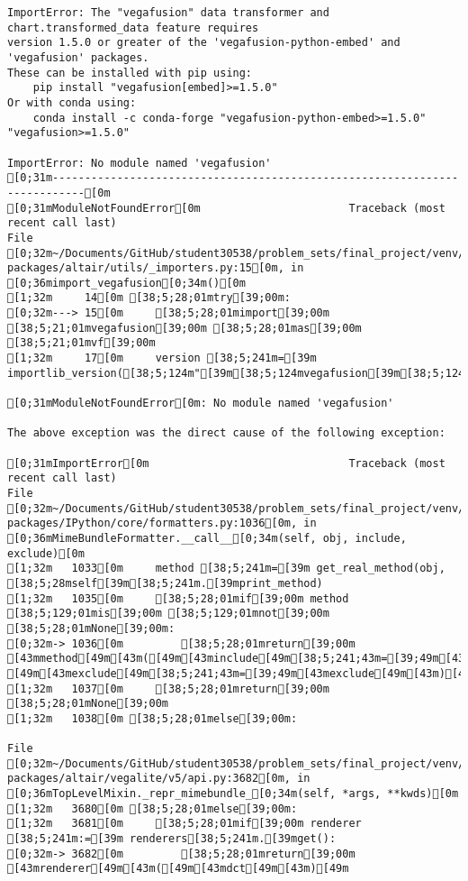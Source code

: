 \documentclass[
  letterpaper,
  DIV=11,
  numbers=noendperiod]{scrartcl}
\begin{document}
\begin{verbatim}
ImportError: The "vegafusion" data transformer and chart.transformed_data feature requires
version 1.5.0 or greater of the 'vegafusion-python-embed' and 'vegafusion' packages.
These can be installed with pip using:
    pip install "vegafusion[embed]>=1.5.0"
Or with conda using:
    conda install -c conda-forge "vegafusion-python-embed>=1.5.0" "vegafusion>=1.5.0"

ImportError: No module named 'vegafusion'
[0;31m---------------------------------------------------------------------------[0m
[0;31mModuleNotFoundError[0m                       Traceback (most recent call last)
File [0;32m~/Documents/GitHub/student30538/problem_sets/final_project/venv/lib/python3.13/site-packages/altair/utils/_importers.py:15[0m, in [0;36mimport_vegafusion[0;34m()[0m
[1;32m     14[0m [38;5;28;01mtry[39;00m:
[0;32m---> 15[0m     [38;5;28;01mimport[39;00m [38;5;21;01mvegafusion[39;00m [38;5;28;01mas[39;00m [38;5;21;01mvf[39;00m
[1;32m     17[0m     version [38;5;241m=[39m importlib_version([38;5;124m"[39m[38;5;124mvegafusion[39m[38;5;124m"[39m)

[0;31mModuleNotFoundError[0m: No module named 'vegafusion'

The above exception was the direct cause of the following exception:

[0;31mImportError[0m                               Traceback (most recent call last)
File [0;32m~/Documents/GitHub/student30538/problem_sets/final_project/venv/lib/python3.13/site-packages/IPython/core/formatters.py:1036[0m, in [0;36mMimeBundleFormatter.__call__[0;34m(self, obj, include, exclude)[0m
[1;32m   1033[0m     method [38;5;241m=[39m get_real_method(obj, [38;5;28mself[39m[38;5;241m.[39mprint_method)
[1;32m   1035[0m     [38;5;28;01mif[39;00m method [38;5;129;01mis[39;00m [38;5;129;01mnot[39;00m [38;5;28;01mNone[39;00m:
[0;32m-> 1036[0m         [38;5;28;01mreturn[39;00m [43mmethod[49m[43m([49m[43minclude[49m[38;5;241;43m=[39;49m[43minclude[49m[43m,[49m[43m [49m[43mexclude[49m[38;5;241;43m=[39;49m[43mexclude[49m[43m)[49m
[1;32m   1037[0m     [38;5;28;01mreturn[39;00m [38;5;28;01mNone[39;00m
[1;32m   1038[0m [38;5;28;01melse[39;00m:

File [0;32m~/Documents/GitHub/student30538/problem_sets/final_project/venv/lib/python3.13/site-packages/altair/vegalite/v5/api.py:3682[0m, in [0;36mTopLevelMixin._repr_mimebundle_[0;34m(self, *args, **kwds)[0m
[1;32m   3680[0m [38;5;28;01melse[39;00m:
[1;32m   3681[0m     [38;5;28;01mif[39;00m renderer [38;5;241m:=[39m renderers[38;5;241m.[39mget():
[0;32m-> 3682[0m         [38;5;28;01mreturn[39;00m [43mrenderer[49m[43m([49m[43mdct[49m[43m)[49m


\end{verbatim}
\end{document}
